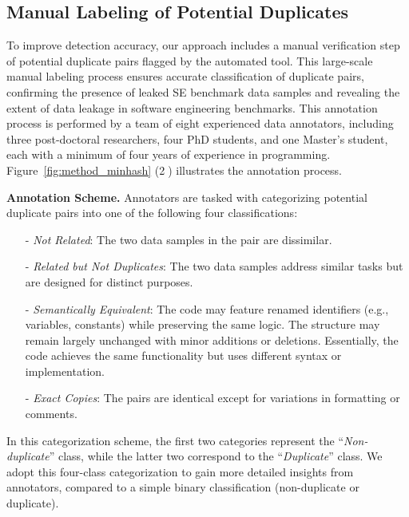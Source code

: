 \subsection{Manual Labeling of Potential Duplicates} 


To improve detection accuracy, our approach includes a manual verification step of potential duplicate pairs flagged by the automated tool. 
This large-scale manual labeling process ensures accurate classification of duplicate pairs, confirming the presence of leaked SE benchmark data samples and revealing the extent of data leakage in software engineering benchmarks.
This annotation process is performed by a team of eight experienced data annotators, including three post-doctoral researchers, four PhD students, and one Master's student, each with a minimum of four years of experience in programming. Figure~\ref{fig:method_minhash} (\textcircled{2}) illustrates the annotation process.



\vspace{0.1cm}
\noindent \textbf{Annotation Scheme.} 
Annotators are tasked with categorizing potential duplicate pairs into one of the following four classifications:
\noindent
\begin{itemize} [left=0pt]
\setlength{\itemsep}{0pt} %
\setlength{\parskip}{0pt} %
\setlength{\parsep}{0pt}  %
\item [-] \textit{Not Related}: The two data samples in the pair are dissimilar. 
\item [-] \textit{Related but Not Duplicates}:  
The two data samples address similar tasks but are designed for distinct purposes.
\item [-] \textit{Semantically Equivalent}: The code may feature renamed identifiers (e.g., variables, constants) while preserving the same logic. The structure may remain largely unchanged with minor additions or deletions. Essentially, the code achieves the same functionality but uses different syntax or implementation. 
\item [-] \textit{Exact Copies}: The pairs are identical except for variations in formatting or comments. 
\end{itemize}
\noindent
In this categorization scheme, the first two categories represent the ``\textit{Non-duplicate}'' class, while the latter two correspond to the ``\textit{Duplicate}'' class. We adopt this four-class categorization to gain more detailed insights from annotators, compared to a simple binary classification (non-duplicate or duplicate).

